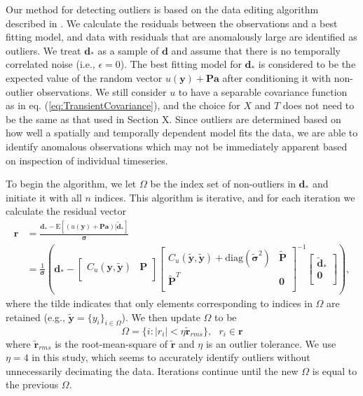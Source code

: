 \documentclass[10pt,a4paper]{article}
\begin{document}
Our method for detecting outliers is based on the data editing algorithm described in \citet{Gibbs2011}. We calculate the residuals between the observations and a best fitting model, and data with residuals that are anomalously large are identified as outliers. We treat $\bm{d}_*$ as a sample of $\bm{d}$ and assume that there is no temporally correlated noise (i.e., $\epsilon = 0$).  The best fitting model for $\bm{d}_*$ is considered to be the expected value of the random vector $u(\bm{y}) + \bm{P}\bm{a}$ after conditioning it with non-outlier observations.  We still consider $u$ to have a separable covariance function as in eq. (\ref{eq:TransientCovariance}), and the choice for $X$ and $T$ does not need to be the same as that used in Section X. Since outliers are determined based on how well a spatially and temporally dependent model fits the data, we are able to identify anomalous observations which may not be immediately apparent based on inspection of individual timeseries. 

To begin the algorithm, we let $\Omega$ be the index set of non-outliers in $\bm{d}_*$ and initiate it with all $n$ indices. This algorithm is iterative, and for each iteration we calculate the residual vector
\begin{align}\label{eq:Residual}
\bm{r} &= \frac{\bm{d}_* - \mathrm{E}\left[(u(\bm{y}) + \bm{P}\bm{a})|\tilde{\bm{d}}_* \right]}{\bm{\sigma}} \\
       &= \frac{1}{\bm{\sigma}}\left(\bm{d}_*  - 
\left[ 
\begin{array}{cc}
C_u(\bm{y},\tilde{\bm{y}}) & \bm{P} \\
\end{array}
\right]
\left[
\begin{array}{cc}
C_u(\tilde{\bm{y}},\tilde{\bm{y}}) + \mathrm{diag}(\tilde{\bm{\sigma}}^2) & \tilde{\bm{P}} \\
\tilde{\bm{P}}^T  & \bm{0} \\
\end{array}
\right]^{-1}
\left[
\begin{array}{c}
\tilde{\bm{d}}_* \\
\bm{0} \\
\end{array}
\right] 
\right),
\end{align}
where the tilde indicates that only elements corresponding to indices in $\Omega$ are retained (e.g., $\tilde{\bm{y}} = \{y_i\}_{i\in\Omega}$). We then update $\Omega$ to be
\begin{equation}\label{eq:Update}
\Omega = \{i : |r_i| < \eta \tilde{\bm{r}}_{rms}\}, \ \ \ r_i \in \bm{r}
\end{equation} 
where $\tilde{\bm{r}}_{rms}$ is the root-mean-square of $\tilde{\bm{r}}$ and $\eta$ is an outlier tolerance. We use $\eta=4$ in this study, which seems to accurately identify outliers without unnecessarily decimating the data. Iterations continue until the new $\Omega$ is equal to the previous $\Omega$. 
\end{document}
